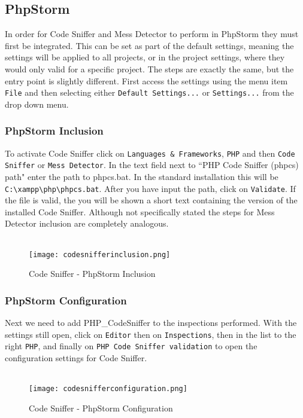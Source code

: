\subsection{PhpStorm}

In order for Code Sniffer and Mess Detector to perform in PhpStorm they must first be integrated. This can be set as part of the default settings, meaning the settings will be applied to all projects, or in the project settings, where they would only valid for a specific project. The steps are exactly the same, but the entry point is slightly different. First access the settings using the menu item \texttt{File} and then selecting either \texttt{Default Settings...} or \texttt{Settings...} from the drop down menu.

\subsubsection{PhpStorm Inclusion}

To activate Code Sniffer click on \texttt{Languages \& Frameworks}, \texttt{PHP} and then \texttt{Code Sniffer} or \texttt{Mess Detector}. In the text field next to ``PHP Code Sniffer (phpcs) path" enter the path to phpcs.bat. In the standard installation this will be \texttt{C:\textbackslash xampp\textbackslash php\textbackslash phpcs.bat}. After you have input the path, click on \texttt{Validate}. If the file is valid, the you will be shown a short text containing the version of the installed Code Sniffer. Although not specifically stated the steps for Mess Detector inclusion are completely analogous.\\
\\
\begin{figure}[h] 
	\centering
	\texttt{[image: codesnifferinclusion.png]}
	\caption{Code Sniffer - PhpStorm Inclusion}
\end{figure}

\subsubsection{PhpStorm Configuration}

Next we need to add PHP\_CodeSniffer to the inspections performed. With the settings still open, click on \texttt{Editor} then on \texttt{Inspections}, then in the list to the right \texttt{PHP}, and finally on \texttt{PHP Code Sniffer validation} to open the configuration settings for Code Sniffer.\\
\\
\begin{figure}[h] 
	\centering
	\texttt{[image: codesnifferconfiguration.png]}
	\caption{Code Sniffer - PhpStorm Configuration}
	\label{fig:cspsc}
\end{figure}

